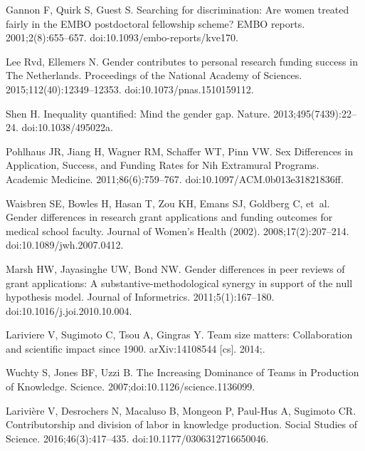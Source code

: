 \documentclass[10pt,letterpaper]{article}
\begin{document}
\begin{thebibliography}{100}
Gannon F, Quirk S, Guest S.
\newblock Searching for discrimination: {Are} women treated fairly in the
  {EMBO} postdoctoral fellowship scheme?
\newblock EMBO reports. 2001;2(8):655--657.
\newblock doi:{10.1093/embo-reports/kve170}.

Lee Rvd, Ellemers N.
\newblock Gender contributes to personal research funding success in {The}
  {Netherlands}.
\newblock Proceedings of the National Academy of Sciences.
  2015;112(40):12349--12353.
\newblock doi:{10.1073/pnas.1510159112}.

Shen H.
\newblock Inequality quantified: {Mind} the gender gap.
\newblock Nature. 2013;495(7439):22--24.
\newblock doi:{10.1038/495022a}.

Pohlhaus JR, Jiang H, Wagner RM, Schaffer WT, Pinn VW.
\newblock Sex {Differences} in {Application}, {Success}, and {Funding} {Rates}
  for {Nih} {Extramural} {Programs}.
\newblock Academic Medicine. 2011;86(6):759--767.
\newblock doi:{10.1097/ACM.0b013e31821836ff}.

Waisbren SE, Bowles H, Hasan T, Zou KH, Emans SJ, Goldberg C, et~al.
\newblock Gender differences in research grant applications and funding
  outcomes for medical school faculty.
\newblock Journal of Women's Health (2002). 2008;17(2):207--214.
\newblock doi:{10.1089/jwh.2007.0412}.

Marsh HW, Jayasinghe UW, Bond NW.
\newblock Gender differences in peer reviews of grant applications: {A}
  substantive-methodological synergy in support of the null hypothesis model.
\newblock Journal of Informetrics. 2011;5(1):167--180.
\newblock doi:{10.1016/j.joi.2010.10.004}.

Lariviere V, Sugimoto C, Tsou A, Gingras Y.
\newblock Team size matters: {Collaboration} and scientific impact since 1900.
\newblock arXiv:14108544 [cs]. 2014;.

Wuchty S, Jones BF, Uzzi B.
\newblock The {Increasing} {Dominance} of {Teams} in {Production} of
  {Knowledge}.
\newblock Science. 2007;doi:{10.1126/science.1136099}.

Larivi{\`e}re V, Desrochers N, Macaluso B, Mongeon P, Paul-Hus A, Sugimoto CR.
\newblock Contributorship and division of labor in knowledge production.
\newblock Social Studies of Science. 2016;46(3):417--435.
\newblock doi:{10.1177/0306312716650046}.


\end{thebibliography}
\end{document}
